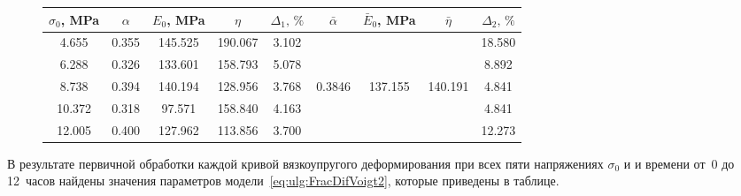 \begin{figure}[p!]
		\begin{tabular}{|c||c|c|c|c||c|c|c|c|}

\hline 

\rule{0mm}{11pt}%

\footnotesize $\sigma_{0}$, MPa & \footnotesize  $\alpha$ & \footnotesize  $E_{0}$, MPa & \footnotesize  $\eta$ & \footnotesize  $\Delta_{1},\, \%$ & \footnotesize  $\bar\alpha$ & \footnotesize  $\bar E_{0}$, MPa & \footnotesize  $\bar \eta$ & \footnotesize  $\Delta_{2},\, \%$\\

			\hline 

			\rule{0mm}{12pt}%

			\phantom{1}4.655 & 0.355 & 145.525 & 190.067 & 3.102 & & & & 18.580\\ 

			 \phantom{1}6.288 & 0.326 & 133.601 & 158.793 & 5.078 & & & & \phantom{1}8.892 \\

			 \phantom{1}8.738 & 0.394 & 140.194 & 128.956 & 3.768 & 0.3846 & 137.155 & 140.191 & \phantom{1}4.841 \\

			 10.372 & 0.318 & \phantom{1}97.571 & 158.840 & 4.163 & & & & \phantom{1}4.841 \\

			 12.005 & 0.400 & 127.962 & 113.856 & 3.700 & & & & 12.273 \\

			\hline

		\end{tabular}

\end{figure}









В результате первичной обработки каждой кривой вязкоупругого деформирования при всех пяти напряжениях $\sigma_{0}$ и и времени от~0 до 12~часов найдены значения параметров модели~\eqref{eq:ulg:FracDifVoigt2}, которые приведены в таблице. 


